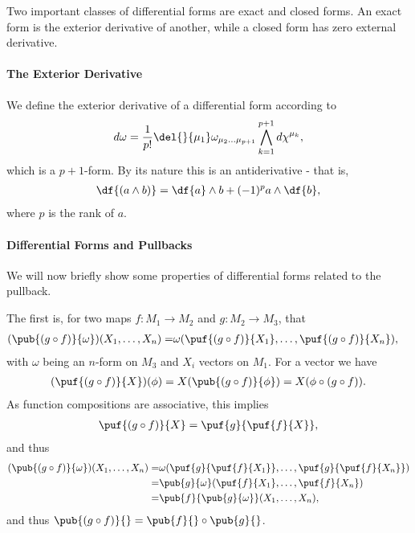 Two important classes of differential forms are exact and closed forms. An exact form is the exterior derivative of another, while a closed form has zero external derivative.

\paragraph{The Exterior Derivative}
We define the exterior derivative of a differential form according to
\begin{align*}
	d\omega = \frac{1}{p!}\del{}{\mu_{1}}\omega_{\mu_{2}\dots \mu_{p + 1}}\bigwedge\limits_{k = 1}^{p + 1}d\chi^{\mu_{k}},
\end{align*}
which is a $p + 1$-form. By its nature this is an antiderivative - that is,
\begin{align*}
	\df{(a\wedge b)} = \df{a}\wedge b + (-1)^{p}a\wedge\df{b},
\end{align*}
where $p$ is the rank of $a$.

\paragraph{Differential Forms and Pullbacks}
We will now briefly show some properties of differential forms related to the pullback.

The first is, for two maps $f: M_{1}\to M_{2}$ and $g: M_{2}\to M_{3}$, that
\begin{align*}
	(\pub{(g\circ f)}{\omega})(X_{1}, \dots, X_{n}) =& \omega(\puf{(g\circ f)}{X_{1}}, \dots, \puf{(g\circ f)}{X_{n}}),
\end{align*}
with $\omega$ being an $n$-form on $M_{3}$ and $X_{i}$ vectors on $M_{1}$. For a vector we have
\begin{align*}
	(\puf{(g\circ f)}{X})(\phi) = X(\pub{(g\circ f)}{\phi}) = X(\phi\circ(g\circ f)).
\end{align*}
As function compositions are associative, this implies
\begin{align}
	\puf{(g\circ f)}{X} = \puf{g}{\puf{f}{X}},
\end{align}
and thus
\begin{align*}
	(\pub{(g\circ f)}{\omega})(X_{1}, \dots, X_{n}) =& \omega(\puf{g}{\puf{f}{X_{1}}}, \dots, \puf{g}{\puf{f}{X_{n}}}) \\
	=& \pub{g}{\omega}(\puf{f}{X_{1}}, \dots, \puf{f}{X_{n}}) \\
	=& \pub{f}{\pub{g}{\omega}}(X_{1}, \dots, X_{n}),
\end{align*}
and thus $\pub{(g\circ f)}{} = \pub{f}{}\circ\pub{g}{}$.

